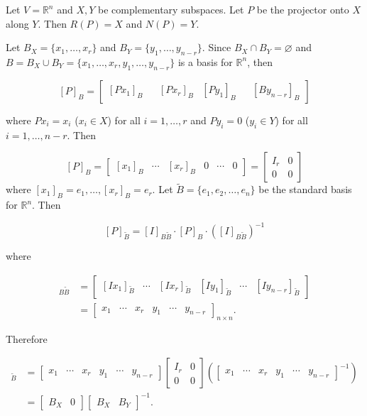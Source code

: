 \documentclass[12pt]{article}
\theoremstyle{definition}
\begin{document}
Let $V = \mathbb{R}^n$ and $X, Y$ be complementary subspaces. Let $P$ be the projector onto $X$
along $Y$. Then $R(P) = X$ and $N(P) = Y$.

Let $B_X = \{x_1, \ldots, x_r\}$ and $B_Y = \{y_1, \ldots, y_{n-r} \}$. Since $B_X \cap B_Y = \varnothing$
and $B = B_X \cup B_Y = \{x_1, \ldots, x_r, y_1, \ldots, y_{n-r} \}$ is a basis for $\mathbb{R}^n$, then

\[ [P]_B = \begin{bmatrix} [Px_1]_B & & [Px_r]_B & [Py_1]_B & & [By_{n-r}]_B \end{bmatrix} \] 

where $Px_i = x_i$ ($x_i \in X$) for all $i = 1, \ldots, r$ and $Py_i = 0$ ($y_i \in Y$) for all
$i = 1, \ldots, n-r$. Then

\[ [P]_B = \begin{bmatrix} [x_1]_B & \cdots & [x_r]_B & 0 & \cdots & 0 \end{bmatrix} =
\begin{bmatrix}
I_r & 0 \\
0 & 0
\end{bmatrix}
\]
where $[x_1]_B = e_1, \ldots, [x_r]_B = e_r$. Let $\tilde{B} = \{e_1, e_2, \ldots, e_n\}$ be the
standard basis for $\mathbb{R}^n$. Then

\[ [P]_{\tilde{B}} = [I]_{B \tilde{B}} \cdot [P]_B \cdot \left([I]_{B \tilde{B}} \right)^{-1} \]

where


\begin{align*}
[I]_{B \tilde{B}} &= \begin{bmatrix} [Ix_1]_{\tilde{B}} & \cdots & [Ix_r]_{\tilde{B}} & [Iy_1]_{\tilde{B}}
& \cdots & [Iy_{n-r}]_{\tilde{B}} \end{bmatrix} \\
&= \begin{bmatrix} x_1 & \cdots & x_r & y_1 & \cdots & y_{n-r} \end{bmatrix}_{n \times n}.
\end{align*}

Therefore

\begin{align*}
[P]_{\tilde{B}} &= \begin{bmatrix} x_1 & \cdots & x_r & y_1 & \cdots & y_{n-r} \end{bmatrix}
\begin{bmatrix}
I_r & 0 \\
0 & 0
\end{bmatrix}
\left(
\begin{bmatrix}
x_1 & \cdots & x_r & y_1 & \cdots & y_{n-r}
\end{bmatrix}^{-1}
\right) \\
&= \begin{bmatrix} B_X & 0 \end{bmatrix} \begin{bmatrix} B_X & B_Y \end{bmatrix}^{-1}.
\end{align*}
\end{document}
